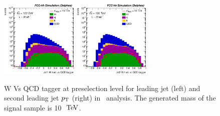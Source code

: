 \begin{figure}[!htb]\centering
\includegraphics[width=0.33\textwidth]{Fig/RSGww/Jet1_Whad_vs_QCD_tagger_sel0_nostack_log.eps}
\includegraphics[width=0.33\textwidth]{Fig/RSGww/Jet2_Whad_vs_QCD_tagger_sel0_nostack_log.eps}
\caption{W Vs QCD tagger at preselection level for leading jet (left) and second leading jet $p\sb{\scriptstyle\mathrm{T}}$ (right) in \rsg\ analysis. The generated mass of the signal sample is 10 $\TeV$.}
\label{fig:RSGww_sel0_tagger}
\end{figure}



